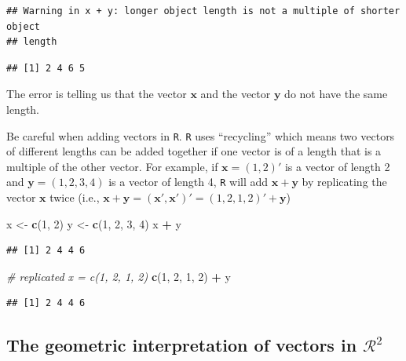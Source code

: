 \documentclass[
]{book}
\newenvironment{Shaded}{\begin{snugshade}}{\end{snugshade}}
\newcommand{\CommentTok}[1]{\textcolor[rgb]{0.56,0.35,0.01}{\textit{#1}}}
\newcommand{\DecValTok}[1]{\textcolor[rgb]{0.00,0.00,0.81}{#1}}
\newcommand{\KeywordTok}[1]{\textcolor[rgb]{0.13,0.29,0.53}{\textbf{#1}}}
\newcommand{\NormalTok}[1]{#1}
\newcommand{\OperatorTok}[1]{\textcolor[rgb]{0.81,0.36,0.00}{\textbf{#1}}}
\newcommand{\StringTok}[1]{\textcolor[rgb]{0.31,0.60,0.02}{#1}}
\theoremstyle{definition}
\theoremstyle{definition}
\theoremstyle{definition}
\theoremstyle{definition}
\theoremstyle{remark}
\begin{document}
\begin{verbatim}
## Warning in x + y: longer object length is not a multiple of shorter object
## length
\end{verbatim}

\begin{verbatim}
## [1] 2 4 6 5
\end{verbatim}

The error is telling us that the vector \(\mathbf{x}\) and the vector \(\mathbf{y}\) do not have the same length.

Be careful when adding vectors in \texttt{R}. \texttt{R} uses ``recycling'' which means two vectors of different lengths can be added together if one vector is of a length that is a multiple of the other vector. For example, if \(\mathbf{x} = (1, 2)'\) is a vector of length 2 and \(\mathbf{y} = (1, 2, 3, 4)\) is a vector of length 4, \texttt{R} will add \(\mathbf{x} + \mathbf{y}\) by replicating the vector \(\mathbf{x}\) twice (i.e., \(\mathbf{x} + \mathbf{y} = \left( \mathbf{x}', \mathbf{x}' \right)' = \left(1, 2, 1, 2 \right)' + \mathbf{y}\))

\begin{Shaded}
\begin{Highlighting}[]
\NormalTok{x <-}\StringTok{ }\KeywordTok{c}\NormalTok{(}\DecValTok{1}\NormalTok{, }\DecValTok{2}\NormalTok{)}
\NormalTok{y <-}\StringTok{ }\KeywordTok{c}\NormalTok{(}\DecValTok{1}\NormalTok{, }\DecValTok{2}\NormalTok{, }\DecValTok{3}\NormalTok{, }\DecValTok{4}\NormalTok{)}
\NormalTok{x }\OperatorTok{+}\StringTok{ }\NormalTok{y}
\end{Highlighting}
\end{Shaded}

\begin{verbatim}
## [1] 2 4 4 6
\end{verbatim}

\begin{Shaded}
\begin{Highlighting}[]
\CommentTok{# replicated x = c(1, 2, 1, 2)}
\KeywordTok{c}\NormalTok{(}\DecValTok{1}\NormalTok{, }\DecValTok{2}\NormalTok{, }\DecValTok{1}\NormalTok{, }\DecValTok{2}\NormalTok{) }\OperatorTok{+}\StringTok{ }\NormalTok{y}
\end{Highlighting}
\end{Shaded}

\begin{verbatim}
## [1] 2 4 4 6
\end{verbatim}

\hypertarget{the-geometric-interpretation-of-vectors-in-mathcalr2}{%
\subsection{\texorpdfstring{The geometric interpretation of vectors in \(\mathcal{R}^2\)}{The geometric interpretation of vectors in \textbackslash mathcal\{R\}\^{}2}}\label{the-geometric-interpretation-of-vectors-in-mathcalr2}}
\end{document}
